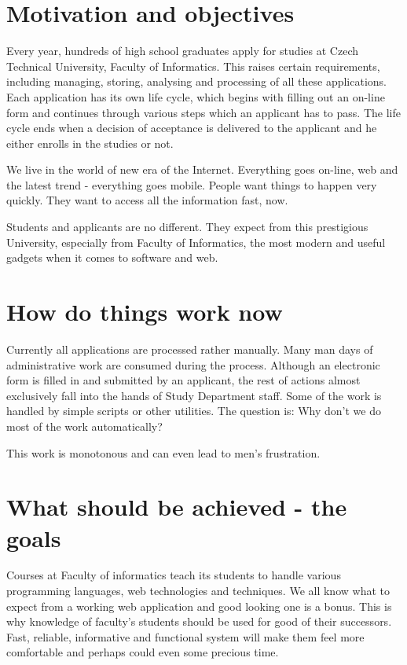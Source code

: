 \begin{introduction}
	\section{Motivation and objectives}

	Every year, hundreds of high school graduates apply for studies at Czech Technical University, Faculty of Informatics.
	This raises certain requirements, including managing, storing, analysing and processing of all these applications.
	Each application has its own life cycle, which begins with filling out an on-line form and continues through various
	steps which an applicant has to pass. The life cycle ends when a decision of acceptance is delivered to the applicant
	and he either enrolls in the studies or not.
	
	We live in the world of new era of the Internet. Everything goes on-line, web and the latest trend - everything goes
	mobile. People want things to happen very quickly. They want to access all the information fast, now.
	
	Students and applicants are no different. They expect from this prestigious University, especially from Faculty of
	Informatics, the most modern and useful gadgets when it comes to software and web.
	
	\section{How do things work now}
	
	Currently all applications are processed rather manually. Many man days of administrative work are consumed during the
	process. Although an electronic form is filled in and submitted by an applicant, the rest of actions almost exclusively
	fall into the hands of Study Department staff. Some of the work is handled by simple scripts or other utilities. The
	question is: Why don't we do most of the work automatically?
	
	This work is monotonous and can even lead to men's frustration.
	
	\section{What should be achieved - the goals}
	
	Courses at Faculty of informatics teach its students to handle various programming languages, web technologies and
	techniques.
	We all know what to expect from a working web application and good looking one is a bonus. This is why knowledge of
	faculty's students should be used for good of their successors. Fast, reliable, informative and functional system will
	make them feel more comfortable and perhaps could even some precious time.
	

\end{introduction}

